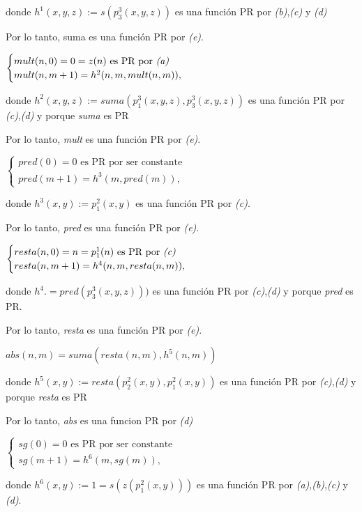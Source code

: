 \documentclass[a4paper,12pt]{article}
\begin{document}
donde $h^{1}(x,y,z):=s(p_{3}^{3}(x,y,z))$ es una función PR por \textit{(b)},\textit{(c)} y \textit{(d)}

Por lo tanto, suma es una función PR por \textit{(e)}.

$\begin{cases}mult(n,0)=0=z(n) \text{ es PR por \textit{(a)}} \\
mult(n,m + 1) = h^{2}(n,m,mult(n,m)),
\end{cases}$

donde $h^{2}(x,y,z):=suma(p^{3}_{1}(x,y,z), p_{3}^{3}(x,y,z))$ es una función PR por  \textit{(c)},\textit{(d)} y porque \textit{suma} es PR

Por lo tanto, \textit{mult} es una función PR por \textit{(e)}.

$\begin{cases}pred(0)=0 \text{ es PR por ser constante} \\
pred(m + 1) = h^{3}(m,pred(m)),
\end{cases}$

donde $h^{3}(x,y):= p_{1}^{2}(x,y)$ es una función PR por \textit{(c)}.

Por lo tanto, \textit{pred} es una función PR por \textit{(e)}.

$\begin{cases}resta(n,0)=n=p^{1}_{1}(n) \text{ es PR por \textit{(c)}} \\
resta(n,m + 1) = h^{4}(n,m,resta(n,m)),
\end{cases}$

donde $h^{4}.=pred(p_{3}^{3}(x,y,z)))$ es una función PR por \textit{(c)},\textit{(d)} y porque \textit{pred} es PR.

Por lo tanto, \textit{resta} es una función PR por \textit{(e)}.

$abs(n,m)=suma(resta(n,m),h^{5}(n,m))$

donde $h^{5}(x,y):=resta(p_{2}^{2}(x,y),p_{1}^{2}(x,y))$ es una función PR por \textit{(c)},\textit{(d)} y porque \textit{resta} es PR

Por lo tanto, \textit{abs} es una funcion PR por \textit{(d)}

$\begin{cases}sg(0)=0 \text{ es PR por ser constante} \\
sg(m + 1) = h^{6}(m,sg(m)),
\end{cases}$

donde $h^{6}(x,y) := 1 =s(z(p_{1}^{2}(x,y)))$ es una función PR por \textit{(a)},\textit{(b)},\textit{(c)} y \textit{(d)}.
\end{document}
